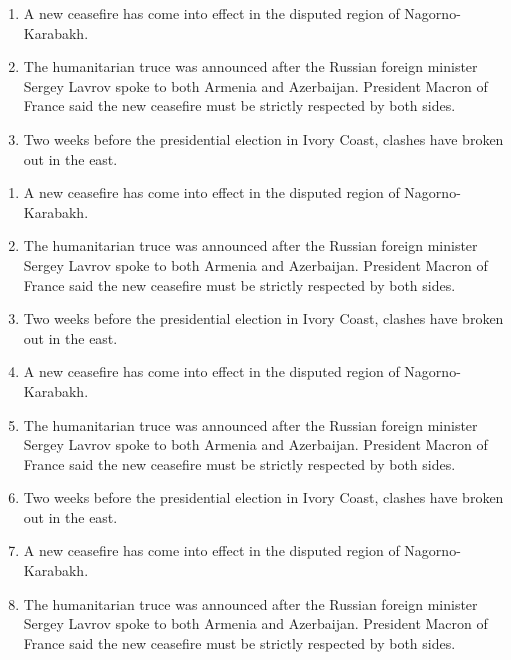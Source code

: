 \documentclass[UTF8,12pt,twoside,a4paper]{ctexart} %
\begin{document}
\begin{titlepage}
\begin{flushleft}
{\setmainfont{Times New Roman}}
	\bfseries{}
\end{flushleft}

\begin{enumerate}%
  \item A new ceasefire has come into effect in the disputed region of Nagorno-Karabakh. 
  \item  The humanitarian truce was announced after the Russian foreign minister Sergey Lavrov spoke to both Armenia and Azerbaijan. President Macron of France said the new ceasefire must be strictly respected by both sides.
  \item Two weeks before the presidential election in Ivory Coast, clashes have broken out in the east.
\end{enumerate}


\begin{flushleft}
{\setmainfont{Times New Roman}}
	\bfseries{}
\end{flushleft}

\begin{enumerate}%
  \item A new ceasefire has come into effect in the disputed region of Nagorno-Karabakh. 
  \item  The humanitarian truce was announced after the Russian foreign minister Sergey Lavrov spoke to both Armenia and Azerbaijan. President Macron of France said the new ceasefire must be strictly respected by both sides.
  \item Two weeks before the presidential election in Ivory Coast, clashes have broken out in the east.
	\item A new ceasefire has come into effect in the disputed region of Nagorno-Karabakh. 
  \item  The humanitarian truce was announced after the Russian foreign minister Sergey Lavrov spoke to both Armenia and Azerbaijan. President Macron of France said the new ceasefire must be strictly respected by both sides.
  \item Two weeks before the presidential election in Ivory Coast, clashes have broken out in the east.
	\item A new ceasefire has come into effect in the disputed region of Nagorno-Karabakh. 
  \item  The humanitarian truce was announced after the Russian foreign minister Sergey Lavrov spoke to both Armenia and Azerbaijan. President Macron of France said the new ceasefire must be strictly respected by both sides.
\end{enumerate}


\end{titlepage}
\end{document}
